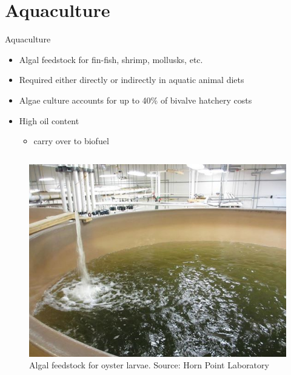 \documentclass[8pt]{beamer}\usepackage[]{graphicx}\usepackage[]{color}
\begin{document}
\section{Aquaculture}
\begin{frame}{Aquaculture}
\begin{itemize}
\item Algal feedstock for fin-fish, shrimp, mollusks, etc.
\item Required either directly or indirectly in aquatic animal diets
\item Algae culture accounts for up to 40\% of bivalve hatchery costs %
\item High oil content
  \begin{itemize}
  \item carry over to biofuel
  \end{itemize}
\end{itemize}
\begin{columns}%
                        \begin{figure}
                        \includegraphics[width=1\textwidth]{./figure/HornPoint2013_Algae_feedstock}
                        \caption{Algal feedstock for oyster larvae. Source: Horn Point Laboratory}
                        \end{figure}

\end{columns}
\end{frame}
\end{document}
